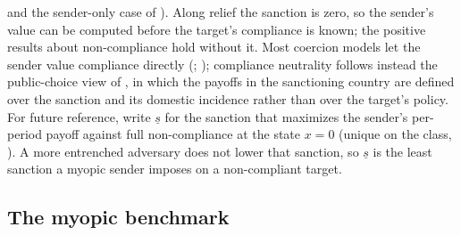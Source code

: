 and the sender-only case of ). Along relief the
sanction is zero, so the sender's value can be computed before the target's
compliance is known; the positive results about non-compliance hold without it. Most coercion models let the sender value
compliance directly (\citealp[p.~903]{Eaton1992}; \citealp[p.~567]{Marinov2005});
compliance neutrality follows instead the public-choice view of
\citet[eqs.~(1) and~(1$'$)]{Kaempfer1988}, in which the payoffs in the sanctioning
country are defined over the sanction and its domestic incidence rather than over
the target's policy. For future reference, write $\underline s$ for the
sanction that maximizes the sender's per-period payoff against full non-compliance at
the state $x=0$ (unique on the class, ). A more entrenched
adversary does not lower that sanction, so $\underline s$ is the least sanction a
myopic sender imposes on a non-compliant target.

\subsection{The myopic benchmark}
\label{sec:model:myopic}
\label{sec:model:conditions}

